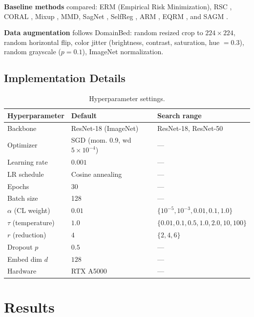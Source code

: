 \documentclass[12pt,a4paper]{article}
\begin{document}
\textbf{Baseline methods} compared:
ERM (Empirical Risk Minimization), RSC \citep{huang2020}, CORAL \citep{sun2016},
Mixup \citep{zhang2018}, MMD, SagNet \citep{nam2021}, SelfReg \citep{kim2021},
ARM \citep{zhang2021}, EQRM \citep{eastwood2022}, and SAGM \citep{wang2023}.

\textbf{Data augmentation} follows DomainBed: random resized crop to $224{\times}224$,
random horizontal flip, color jitter (brightness, contrast, saturation, hue $= 0.3$),
random grayscale ($p{=}0.1$), ImageNet normalization.

\subsection{Implementation Details}

\begin{table}[H]
  \centering
  \caption{Hyperparameter settings.}
  \label{tab:hyperparams}
  \begin{tabular}{@{}lll@{}}
    \toprule
    \textbf{Hyperparameter} & \textbf{Default} & \textbf{Search range} \\
    \midrule
    Backbone     & ResNet-18 (ImageNet)  & ResNet-18, ResNet-50 \\
    Optimizer    & SGD (mom. 0.9, wd $5{\times}10^{-4}$) & — \\
    Learning rate & $0.001$              & — \\
    LR schedule  & Cosine annealing     & — \\
    Epochs       & 30                    & — \\
    Batch size   & 128                   & — \\
    $\alpha$ (CL weight) & $0.01$       & $\{10^{-5}, 10^{-3}, 0.01, 0.1, 1.0\}$ \\
    $\tau$ (temperature) & $1.0$        & $\{0.01, 0.1, 0.5, 1.0, 2.0, 10, 100\}$ \\
    $r$ (reduction)      & $4$          & $\{2, 4, 6\}$ \\
    Dropout $p$          & $0.5$        & — \\
    Embed dim $d$        & $128$        & — \\
    Hardware             & RTX A5000    & — \\
    \bottomrule
  \end{tabular}
\end{table}

\section{Results}
\label{sec:results}
\end{document}
